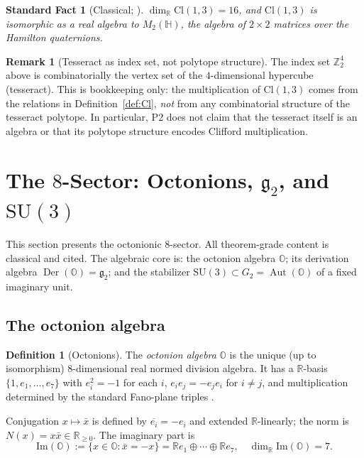 \documentclass[11pt, a4paper]{amsart}
\newtheorem{fact}[theorem]{Standard Fact}
\theoremstyle{definition}
\newtheorem{definition}[theorem]{Definition}
\newtheorem{remark}[theorem]{Remark}
\newcommand{\R}{\mathbb{R}}
\newcommand{\Z}{\mathbb{Z}}
\newcommand{\HH}{\mathbb{H}}
\newcommand{\OO}{\mathbb{O}}
\newcommand{\Der}{\operatorname{Der}}
\newcommand{\Aut}{\operatorname{Aut}}
\newcommand{\Cl}{\mathrm{Cl}}
\newcommand{\SU}{\mathrm{SU}}
\renewcommand{\Im}{\mathrm{Im}}
\begin{document}
\begin{fact}[Classical; \cite{Lounesto, Chevalley}]
\label{fact:Cl-structure}
$\dim_\R \Cl(1,3) = 16$, and $\Cl(1,3)$ is isomorphic as a real
algebra to $M_2(\HH)$, the algebra of $2 \times 2$ matrices over
the Hamilton quaternions.
\end{fact}

\begin{remark}[Tesseract as index set, not polytope structure]
\label{rmk:tesseract-index}
The index set $\Z_2^4$ above is combinatorially the vertex set of
the $4$-dimensional hypercube (tesseract). This is bookkeeping
only: the multiplication of $\Cl(1,3)$ comes from the relations
in Definition~\ref{def:Cl}, \emph{not} from any combinatorial
structure of the tesseract polytope. In particular, P2 does not
claim that the tesseract itself is an algebra or that its polytope
structure encodes Clifford multiplication.
\end{remark}

\section{The $8$-Sector: Octonions, $\mathfrak{g}_2$, and $\SU(3)$}
\label{sec:8-sector}

This section presents the octonionic $8$-sector. All theorem-grade
content is classical and cited. The algebraic core is: the octonion
algebra $\OO$; its derivation algebra $\Der(\OO) = \mathfrak{g}_2$;
and the stabilizer $\SU(3) \subset G_2 = \Aut(\OO)$ of a fixed
imaginary unit.

\subsection{The octonion algebra}

\begin{definition}[Octonions]
\label{def:octonions}
The \emph{octonion algebra} $\OO$ is the unique (up to
isomorphism) $8$-dimensional real normed division algebra. It has
a $\R$-basis $\{1, e_1, \ldots, e_7\}$ with $e_i^2 = -1$ for each
$i$, $e_i e_j = -e_j e_i$ for $i \neq j$, and multiplication
determined by the standard Fano-plane triples
\cite[\S 2.1]{BaezOctonions}.

Conjugation $x \mapsto \bar x$ is defined by $\overline{e_i} =
-e_i$ and extended $\R$-linearly; the norm is $N(x) = x \bar x
\in \R_{\geq 0}$. The imaginary part is
\[
  \Im(\OO) := \{x \in \OO : \bar x = -x\} = \R e_1 \oplus \cdots
  \oplus \R e_7, \quad \dim_\R \Im(\OO) = 7.
\]
\end{definition}
\end{document}
